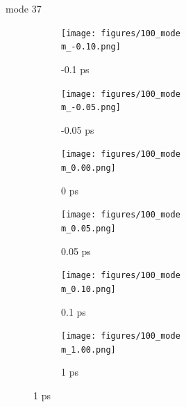 \documentclass{beamer}
\newcommand\w{0.32}
\begin{document}
\renewcommand\m{37}
\begin{frame}{mode \m}
	\begin{figure}
		\centering
		\begin{subfigure}[b]{\w\textwidth}
			\centering
			\texttt{[image: figures/100\_mode\\m\_-0.10.png]}
			\caption{-0.1 ps}
		\end{subfigure}
		\begin{subfigure}[b]{\w\textwidth}
			\centering
			\texttt{[image: figures/100\_mode\\m\_-0.05.png]}
			\caption{-0.05 ps}
		\end{subfigure}
		\begin{subfigure}[b]{\w\textwidth}
			\centering
			\texttt{[image: figures/100\_mode\\m\_0.00.png]}
			\caption{0 ps}
		\end{subfigure}
		\begin{subfigure}[b]{\w\textwidth}
			\centering
			\texttt{[image: figures/100\_mode\\m\_0.05.png]}
			\caption{0.05 ps}
		\end{subfigure}
		\begin{subfigure}[b]{\w\textwidth}
			\centering
			\texttt{[image: figures/100\_mode\\m\_0.10.png]}
			\caption{0.1 ps}
		\end{subfigure}
		\begin{subfigure}[b]{\w\textwidth}
			\centering
			\texttt{[image: figures/100\_mode\\m\_1.00.png]}
			\caption{1 ps}
		\end{subfigure}
	\end{figure}
\end{frame}
\end{document}
